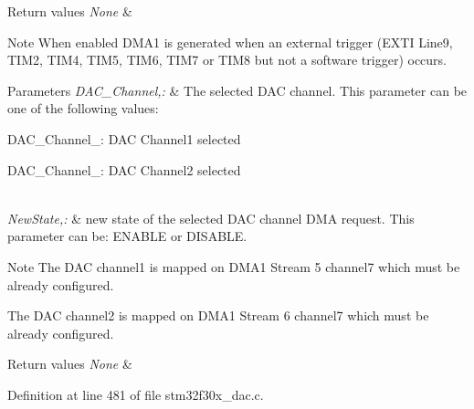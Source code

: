 \begin{DoxyRetVals}{Return values}
{\em None} & \\
\hline
\end{DoxyRetVals}
\begin{DoxyNote}{Note}
When enabled D\-M\-A1 is generated when an external trigger (E\-X\-T\-I Line9, T\-I\-M2, T\-I\-M4, T\-I\-M5, T\-I\-M6, T\-I\-M7 or T\-I\-M8 but not a software trigger) occurs. 
\end{DoxyNote}

\begin{DoxyParams}{Parameters}
{\em D\-A\-C\-\_\-\-Channel,\-:} & The selected D\-A\-C channel. This parameter can be one of the following values\-: \begin{DoxyItemize}
\item D\-A\-C\-\_\-\-Channel\-\_\-: D\-A\-C Channel1 selected \item D\-A\-C\-\_\-\-Channel\-\_\-: D\-A\-C Channel2 selected \end{DoxyItemize}
\\
\hline
{\em New\-State,\-:} & new state of the selected D\-A\-C channel D\-M\-A request. This parameter can be\-: E\-N\-A\-B\-L\-E or D\-I\-S\-A\-B\-L\-E. \\
\hline
\end{DoxyParams}
\begin{DoxyNote}{Note}
The D\-A\-C channel1 is mapped on D\-M\-A1 Stream 5 channel7 which must be already configured. 

The D\-A\-C channel2 is mapped on D\-M\-A1 Stream 6 channel7 which must be already configured. 
\end{DoxyNote}

\begin{DoxyRetVals}{Return values}
{\em None} & \\
\hline
\end{DoxyRetVals}


Definition at line 481 of file stm32f30x\-\_\-dac.\-c.

